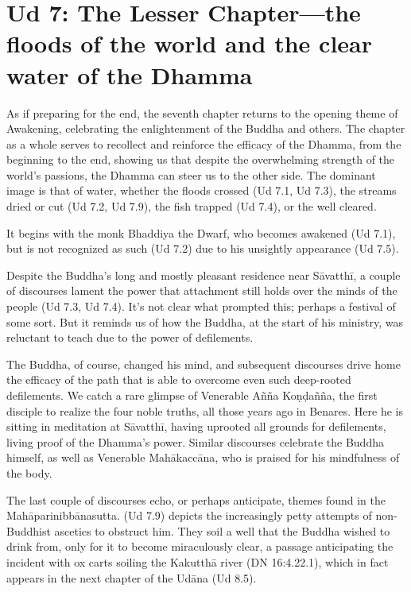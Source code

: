 \documentclass[12pt,openany]{book}%
\begin{document}
\section*{Ud 7: The Lesser Chapter—the floods of the world and the clear water of the Dhamma}

As if preparing for the end, the seventh chapter returns to the opening theme of Awakening, celebrating the enlightenment of the Buddha and others. The chapter as a whole serves to recollect and reinforce the efficacy of the Dhamma, from the beginning to the end, showing us that despite the overwhelming strength of the world’s passions, the Dhamma can steer us to the other side. The dominant image is that of water, whether the floods crossed (Ud 7.1, Ud 7.3), the streams dried or cut (Ud 7.2, Ud 7.9), the fish trapped (Ud 7.4), or the well cleared.

It begins with the monk Bhaddiya the Dwarf, who becomes awakened (Ud 7.1), but is not recognized as such (Ud 7.2) due to his unsightly appearance (Ud 7.5). 

Despite the Buddha’s long and mostly pleasant residence near \textsanskrit{Sāvatthī}, a couple of discourses lament the power that attachment still holds over the minds of the people (Ud 7.3, Ud 7.4). It’s not clear what prompted this; perhaps a festival of some sort. But it reminds us of how the Buddha, at the start of his ministry, was reluctant to teach due to the power of defilements.

The Buddha, of course, changed his mind, and subsequent discourses drive home the efficacy of the path that is able to overcome even such deep-rooted defilements. We catch a rare glimpse of Venerable \textsanskrit{Añña} \textsanskrit{Koṇḍañña}, the first disciple to realize the four noble truths, all those years ago in Benares. Here he is sitting in meditation at \textsanskrit{Sāvatthī}, having uprooted all grounds for defilements, living proof of the Dhamma’s power. Similar discourses celebrate the Buddha himself, as well as Venerable \textsanskrit{Mahākaccāna}, who is praised for his mindfulness of the body.

The last couple of discourses echo, or perhaps anticipate, themes found in the \textsanskrit{Mahāparinibbānasutta}. (Ud 7.9) depicts the increasingly petty attempts of non-Buddhist ascetics to obstruct him. They soil a well that the Buddha wished to drink from, only for it to become miraculously clear, a passage anticipating the incident with ox carts soiling the \textsanskrit{Kakutthā} river (DN 16:4.22.1), which in fact appears in the next chapter of the \textsanskrit{Udāna} (Ud 8.5). 
\end{document}
